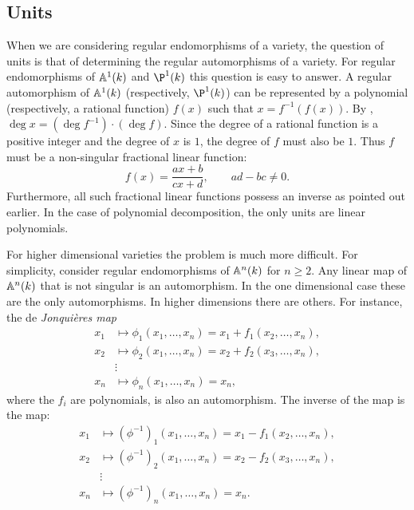 \subsection{Units}

When we are considering regular endomorphisms of a variety, the
question of units is that of determining the regular automorphisms of
a variety.  For regular endomorphisms of $\mathbb{A}^1(k)$ and $\P^1(k)$ this
question is easy to answer.  A regular automorphism of $\mathbb{A}^1(k)$
(respectively, $\P^1(k)$) can be represented by a polynomial
(respectively, a rational function) $f(x)$ such that $x =
f^{-1}(f(x))$.  By , $\deg x = (\deg
f^{-1})\cdot (\deg f)$.  Since the degree of a rational function is a
positive integer and the degree of $x$ is $1$, the degree of $f$ must
also be $1$.  Thus $f$ must be a non-singular fractional linear function:
\[
f(x) = \frac{ax + b}{cx+d}, \qquad ad - bc \not= 0.
\]
Furthermore, all such fractional linear functions possess an inverse
as pointed out earlier.  In the case of polynomial decomposition, the
only units are linear polynomials.

For higher dimensional varieties the problem is much more difficult.
For simplicity, consider regular endomorphisms of $\mathbb{A}^n(k)$ for $n \ge
2$.  Any linear map of $\mathbb{A}^n(k)$ that is not singular is an
automorphism.  In the one dimensional case these are the only
automorphisms.  In higher dimensions there are others.  For instance,
the de {\em Jonqui\`eres map}
\begin{equation} \label{Jonquieres:Eq}
\begin{aligned}
x_1 & \mapsto \phi_1(x_1, \ldots, x_n) =  x_1 + f_1(x_2, \ldots, x_n), \\
x_2 & \mapsto \phi_2(x_1, \ldots, x_n) = x_2 + f_2(x_3, \ldots, x_n), \\
 & \vdots \\
x_n & \mapsto \phi_n(x_1, \ldots, x_n) = x_n,
\end{aligned}
\end{equation}
where the $f_i$ are polynomials, is also an automorphism.  The inverse
of the map  is the map:
\[
\begin{aligned}
x_1 & \mapsto (\phi^{-1})_1(x_1, \ldots, x_n) = x_1 - f_1(x_2, \ldots, x_n), \\
x_2 & \mapsto (\phi^{-1})_2(x_1, \ldots, x_n) = x_2 - f_2(x_3, \ldots, x_n), \\
 & \vdots \\
x_n & \mapsto (\phi^{-1})_n(x_1, \ldots, x_n) =  x_n.
\end{aligned}
\]

